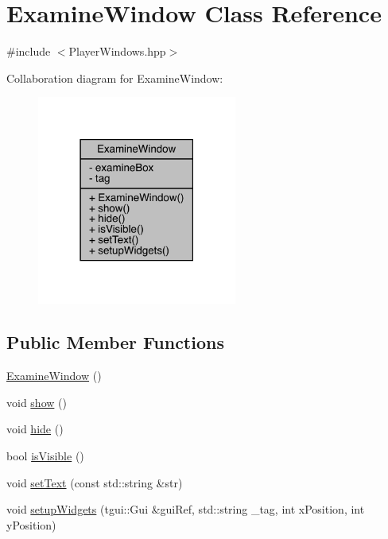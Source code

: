 \hypertarget{class_examine_window}{}\section{Examine\+Window Class Reference}
\label{class_examine_window}


{\ttfamily \#include $<$Player\+Windows.\+hpp$>$}



Collaboration diagram for Examine\+Window\+:
\nopagebreak
\begin{figure}[H]
\begin{center}
\leavevmode
\includegraphics[width=186pt]{db/d68/class_examine_window__coll__graph}
\end{center}
\end{figure}
\subsection*{Public Member Functions}
\begin{DoxyCompactItemize}
\item 
\mbox{\hyperlink{class_examine_window_af33337f9792efd96f096b4689049557b}{Examine\+Window}} ()
\item 
void \mbox{\hyperlink{class_examine_window_a5d93b356de906a2b4891b8ff79425b90}{show}} ()
\item 
void \mbox{\hyperlink{class_examine_window_a43f65ea7b98e29f773cdf0098ab0ed9c}{hide}} ()
\item 
bool \mbox{\hyperlink{class_examine_window_a71b248a6336a0626d8f6593921ecf2bd}{is\+Visible}} ()
\item 
void \mbox{\hyperlink{class_examine_window_ab88efb6bed6125a0c941ce70a360baf0}{set\+Text}} (const std\+::string \&str)
\item 
void \mbox{\hyperlink{class_examine_window_a15f26e824ea2849573ce7a0664adc192}{setup\+Widgets}} (tgui\+::\+Gui \&gui\+Ref, std\+::string \+\_\+tag, int x\+Position, int y\+Position)
\end{DoxyCompactItemize}
